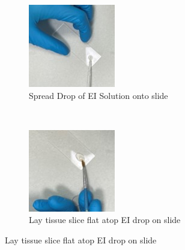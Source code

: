 \begin{figure}[H]

\begin{subfigure}{.4\linewidth}
  \includegraphics[width=\linewidth]{Images/Step1.jpg}
  \caption{Spread Drop of EI Solution onto slide }
  \label{MLEDdet}
\end{subfigure}\hfill 
~ 
\begin{subfigure}{.4\linewidth}
  \includegraphics[width=\linewidth]{Images/Step2.jpg}
  \caption{Lay tissue slice flat atop EI drop on slide}
  \label{energydetPSK}
\end{subfigure}\hfill 


\end{figure}
